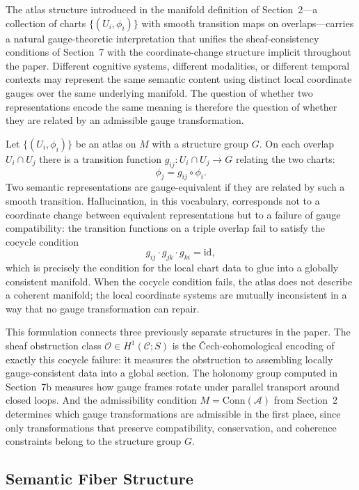 \documentclass[11pt,a4paper,twocolumn]{article}
\begin{document}
The atlas structure introduced in the manifold definition of
Section~2---a collection of charts $\{(U_i, \phi_i)\}$ with smooth
transition maps on overlaps---carries a natural gauge-theoretic
interpretation that unifies the sheaf-consistency conditions of
Section~7 with the coordinate-change structure implicit throughout
the paper. Different cognitive systems, different modalities, or
different temporal contexts may represent the same semantic content
using distinct local coordinate gauges over the same underlying
manifold. The question of whether two representations encode the
same meaning is therefore the question of whether they are related
by an admissible gauge transformation.

Let $\{(U_i, \phi_i)\}$ be an atlas on $M$ with a structure group
$G$. On each overlap $U_i \cap U_j$ there is a transition function
$g_{ij} : U_i \cap U_j \to G$ relating the two charts:
\[
\phi_j = g_{ij} \circ \phi_i.
\]
Two semantic representations are gauge-equivalent if they are
related by such a smooth transition. Hallucination, in this
vocabulary, corresponds not to a coordinate change between
equivalent representations but to a failure of gauge compatibility:
the transition functions on a triple overlap fail to satisfy the
cocycle condition
\[
g_{ij} \cdot g_{jk} \cdot g_{ki} = \mathrm{id},
\]
which is precisely the condition for the local chart data to glue
into a globally consistent manifold. When the cocycle condition
fails, the atlas does not describe a coherent manifold; the local
coordinate systems are mutually inconsistent in a way that no
gauge transformation can repair.

This formulation connects three previously separate structures in
the paper. The sheaf obstruction class $\mathcal{O} \in H^1(\mathcal{C}; S)$
is the Čech-cohomological encoding of exactly this cocycle
failure: it measures the obstruction to assembling locally
gauge-consistent data into a global section. The holonomy group
computed in Section~7b measures how gauge frames rotate under
parallel transport around closed loops. And the admissibility
condition $M = \mathrm{Conn}(\mathcal{A})$ from Section~2 determines
which gauge transformations are admissible in the first place,
since only transformations that preserve compatibility,
conservation, and coherence constraints belong to the structure
group $G$.

\subsection{Semantic Fiber Structure}
\end{document}
